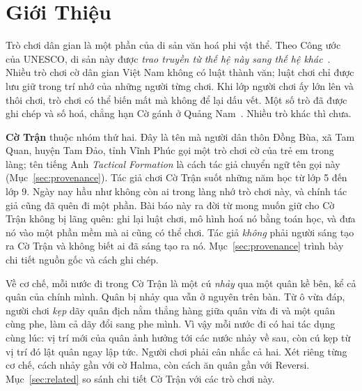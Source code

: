 \section{Giới Thiệu}
\label{sec:intro}

Trò chơi dân gian là một phần của di sản văn hoá phi vật thể. Theo Công
ước của UNESCO, di sản này được \emph{trao truyền từ thế hệ này sang thế
hệ khác}~\citep{unesco2003ich}. Nhiều trò chơi cờ dân gian Việt Nam
không có luật thành văn; luật chơi chỉ được lưu giữ trong trí nhớ của những
người từng chơi. Khi lớp người chơi ấy lớn lên và thôi chơi, trò chơi có
thể biến mất mà không để lại dấu vết. Một số trò đã được ghi chép
và số hoá, chẳng hạn Cờ gánh ở Quảng Nam~\citep{mytour_coganh}. Nhiều trò
khác thì chưa.

\textbf{Cờ Trận} thuộc nhóm thứ hai. Đây là tên mà người dân thôn Đồng Bùa,
xã Tam Quan, huyện Tam Đảo, tỉnh Vĩnh Phúc gọi một trò chơi cờ của trẻ em
trong làng; tên tiếng Anh \emph{Tactical Formation} là cách tác giả chuyển
ngữ tên gọi này (Mục~\ref{sec:provenance}). Tác giả chơi Cờ Trận suốt những năm học từ lớp 5 đến lớp 9.
Ngày nay hầu như không còn ai trong làng nhớ trò chơi này, và chính tác giả
cũng đã quên đi một phần. Bài báo này ra đời từ mong muốn giữ cho Cờ Trận
không bị lãng quên: ghi lại luật chơi, mô hình hoá nó bằng toán học, và
đưa nó vào một phần mềm mà ai cũng có thể chơi. Tác giả \emph{không}
phải người sáng tạo ra Cờ Trận và không biết ai đã sáng tạo ra nó.
Mục~\ref{sec:provenance} trình bày chi tiết nguồn gốc và cách ghi chép.

Về cơ chế, mỗi nước đi trong Cờ Trận là một cú \emph{nhảy} qua một quân
kề bên, kể cả quân của chính mình. Quân bị nhảy qua vẫn ở nguyên trên bàn.
Từ ô vừa đáp, người chơi \emph{kẹp} dãy quân địch nằm thẳng hàng giữa quân
vừa đi và một quân cùng phe, làm cả dãy đổi sang phe mình. Vì vậy mỗi nước
đi có hai tác dụng cùng lúc: vị trí mới của quân ảnh hưởng tới các nước
nhảy về sau, còn cú kẹp từ vị trí đó lật quân ngay lập tức. Người chơi phải
cân nhắc cả hai. Xét riêng từng cơ chế, cách nhảy gần với cờ Halma, còn
cách ăn quân gần với Reversi. Mục~\ref{sec:related} so sánh chi tiết Cờ
Trận với các trò chơi này.


